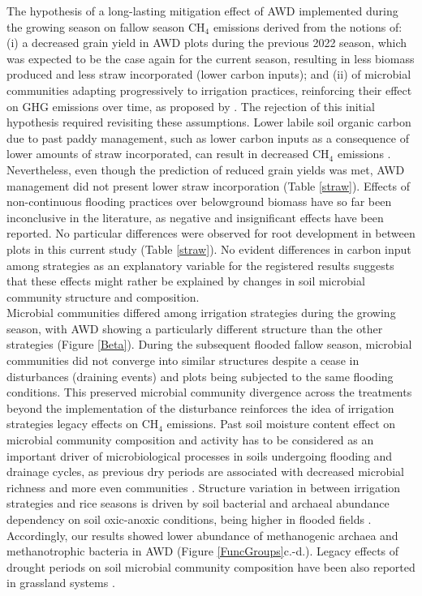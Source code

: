 The hypothesis of a long-lasting mitigation effect of AWD implemented during the growing season on fallow season CH$_{4}$ emissions derived from the notions of: (i) a decreased grain yield in AWD plots during the previous 2022 season, which was expected to be the case again for the current season, resulting in less biomass produced and less straw incorporated (lower carbon inputs); and (ii) of microbial communities adapting progressively to irrigation practices, reinforcing their effect on GHG emissions over time, as proposed by \cite{lagomarsino2016a}. The rejection of this initial hypothesis required revisiting these assumptions. Lower labile soil organic carbon due to past paddy management, such as lower carbon inputs as a consequence of lower amounts of straw incorporated, can result in decreased CH$_{4}$ emissions \citep{hatala2012}. Nevertheless, even though the prediction of reduced grain yields was met, AWD management did not present lower straw incorporation (Table \ref{straw}). Effects of non-continuous flooding practices over belowground biomass have so far been inconclusive in the literature, as negative \citep{oliver2019} and insignificant \citep{carrijo2018} effects have been reported. No particular differences were observed for root development in between plots in this current study (Table \ref{straw}). No evident differences in carbon input among strategies as an explanatory variable for the registered results suggests that these effects might rather be explained by changes in soil microbial community structure and composition. \\

Microbial communities differed among irrigation strategies during the growing season, with AWD showing a particularly different structure than the other strategies (Figure \ref{Beta}). During the subsequent flooded fallow season, microbial communities did not converge into similar structures despite a cease in disturbances (draining events) and plots being subjected to the same flooding conditions. This preserved microbial community divergence across the treatments beyond the implementation of the disturbance reinforces the idea of irrigation strategies legacy effects on CH$_{4}$ emissions. Past soil moisture content effect on microbial community composition and activity has to be considered as an important driver of microbiological processes in soils undergoing flooding and drainage cycles, as previous dry periods are associated with decreased microbial richness and more even communities \citep{banerjee2016}. Structure variation in between irrigation strategies and rice seasons is driven by soil bacterial and archaeal abundance dependency on soil oxic-anoxic conditions, being higher in flooded fields \citep{breidenbach2014}. Accordingly, our results showed lower abundance of methanogenic archaea and methanotrophic bacteria in AWD \citep{hester2022} (Figure \ref{FuncGroups}c.-d.). Legacy effects of drought periods on soil microbial community composition have been also reported in grassland systems \citep{vilonen2023}.\\


